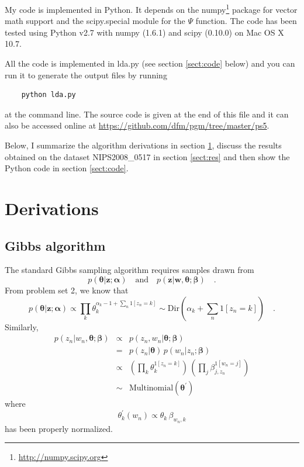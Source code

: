 \documentclass[11pt]{article}
\newcommand{\pr}[1]{\ensuremath{p(#1)}}
\newcommand{\bvec}[1]{\ensuremath{\boldsymbol{#1}}}
\newcommand{\code}[1]{{\sffamily #1}}
\newcommand{\tha}{\bvec{\theta}}
\newcommand{\z}{\bvec{z}}
\newcommand{\w}{\bvec{w}}
\newcommand{\ala}{\bvec{\alpha}}
\newcommand{\ba}{\bvec{\beta}}
\begin{document}
My code is implemented in \code{Python}. It depends on the
\code{numpy}\footnote{\url{http://numpy.scipy.org}} package for vector
math support and the \code{scipy.special} module for the $\Psi$ function.
The code has been tested using \code{Python v2.7} with
\code{numpy (1.6.1)} and \code{scipy (0.10.0)} on \code{Mac OS X 10.7}.

All the code is implemented in \code{lda.py} (see section \ref{sect:code}
below) and you can run it to generate the output files by running
\begin{lstlisting}
    python lda.py
\end{lstlisting}
at the command line. The source code is given at the end of this file and
it can also be accessed online at
\url{https://github.com/dfm/pgm/tree/master/ps5}.

Below, I summarize the algorithm derivations in section \ref{sect:derive},
discuss the results obtained on the dataset \code{NIPS2008\_0517} in section
\ref{sect:res} and then show the \code{Python} code in section \ref{sect:code}.

\section{Derivations} \label{sect:derive}

\subsection{Gibbs algorithm}

The standard Gibbs sampling algorithm requires samples drawn from
\begin{equation}
    \pr{\tha | \z; \ala} \quad \mathrm{and} \quad \pr{\z | \w, \tha; \ba}
    \quad .
\end{equation}
From problem set 2, we know that
\begin{equation}
    \pr{\tha | \z; \ala} \propto \prod_k
        \theta_k^{\alpha_k - 1 + \sum_n 1[z_n = k]} \sim
        \mathrm{Dir} \left ( \alpha_k + \sum_n 1[z_n = k] \right ) \quad .
\end{equation}
Similarly,
\begin{eqnarray}
    \pr{z_n | w_n, \tha; \ba} & \propto & \pr{z_n, w_n | \tha; \ba} \\
        & = & \pr{z_n | \tha} \, \pr{w_n | z_n; \ba} \\
        & \propto & \left ( \prod_k \theta_k^{1[z_n = k]} \right ) \,
                \left ( \prod_j \beta_{j, z_n}^{1[w_n = j]} \right ) \\
        & \sim & \mathrm{Multinomial} (\tha^\prime)
\end{eqnarray}
where
\begin{equation}
    \theta_k^\prime (w_n) \propto \theta_k \, \beta_{w_n, k}
\end{equation}
has been properly normalized.
\end{document}
